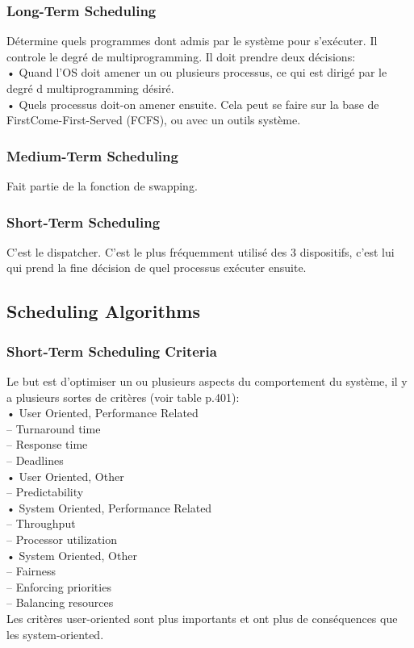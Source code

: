 \subsubsection{Long-Term Scheduling}
Détermine quels programmes dont admis par le système pour s’exécuter. Il controle le degré de multiprogramming. Il doit prendre deux décisions: \\
• Quand l’OS doit amener un ou plusieurs processus, ce qui est dirigé par le degré d multiprogramming désiré.\\
• Quels processus doit-on amener ensuite. Cela peut se faire sur la base de FirstCome-First-Served (FCFS), ou avec un outils système.
\subsubsection{Medium-Term Scheduling}
Fait partie de la fonction de swapping.
\subsubsection{Short-Term Scheduling}
C’est le dispatcher. C’est le plus fréquemment utilisé des 3 dispositifs, c’est lui qui prend la fine décision de quel processus exécuter ensuite.
\subsection{Scheduling Algorithms }
\subsubsection{Short-Term Scheduling Criteria}
Le but est d’optimiser un ou plusieurs aspects du comportement du système, il y a plusieurs sortes de critères (voir table p.401):\\
• User Oriented, Performance Related\\
– Turnaround time \\
– Response time\\
– Deadlines\\
• User Oriented, Other \\
– Predictability \\
• System Oriented, Performance Related \\
– Throughput\\
– Processor utilization \\
• System Oriented, Other\\
– Fairness\\
– Enforcing priorities \\
– Balancing resources\\
Les critères user-oriented sont plus importants et ont plus de conséquences que les system-oriented.

